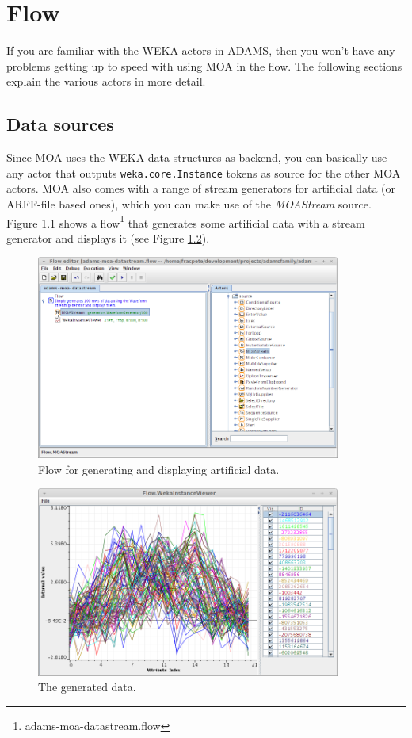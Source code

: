 \documentclass[a4paper]{book}
\begin{document}
\chapter{Flow}
If you are familiar with the WEKA actors in ADAMS, then you won't have any
problems getting up to speed with using MOA in the flow. The following sections
explain the various actors in more detail.

\section{Data sources}
Since MOA uses the WEKA data structures as backend, you can basically use any
actor that outputs \texttt{weka.core.Instance} tokens as source for the other
MOA actors. MOA also comes with a range of stream generators for artificial
data (or ARFF-file based ones), which you can make use of the 
\textit{MOAStream} source. Figure \ref{moa-stream-flow} shows a 
flow\footnote{adams-moa-datastream.flow} that generates some artificial data
with a stream generator and displays it (see Figure \ref{moa-stream-output}).

\begin{figure}[htb]
  \centering
  \includegraphics[width=10.0cm]{images/moa-stream-flow.png}
  \caption{Flow for generating and displaying artificial data.}
  \label{moa-stream-flow}
\end{figure}

\begin{figure}[htb]
  \centering
  \includegraphics[width=10.0cm]{images/moa-stream-output.png}
  \caption{The generated data.}
  \label{moa-stream-output}
\end{figure}
\end{document}

